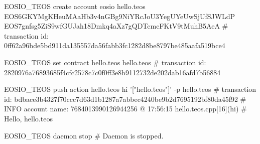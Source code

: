 \begin{DoxyCode}
$ $EOSIO\_TEOS create account eosio hello.teos EOS6GKYMgKHeuMAaHb3v4nGBg9NiYRcJoU3YegUYeUwSjUfSJWLdP
       EOS7gnfsg5ZiS9wfGUJah18Dmkq4aXz7gQDTcmcFKtV9tMuhB5AeA
#   transaction id: 0ff62a96bde5bd911da135557da56fabb3fc1282d8be8797be485aafa519bce4

$ $EOSIO\_TEOS set contract hello.teos hello.teos
#   transaction id: 2820976a76893685f4cfc2578c7c0f0ff3e8b9112732de202dab16afd7b56884

$ $EOSIO\_TEOS push action hello.teos hi '["hello.teos"]' -p hello.teos
#   transaction id: bdbace3b4327f70ccc7d63d1b1287a7abbec4240be9b2d7695192bf80da45f92
#  INFO account name: 7684013990126944256  @ 17:56:15 hello.teos.cpp[16](hi)
#  Hello, hello.teos

$ $EOSIO\_TEOS daemon stop
#  Daemon is stopped.
\end{DoxyCode}
 
